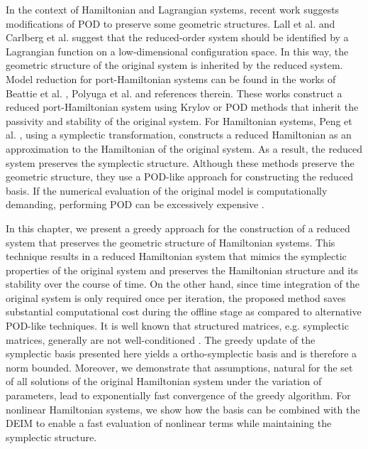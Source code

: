 In the context of Hamiltonian and Lagrangian systems, recent work suggests modifications of POD to preserve some geometric structures. Lall et al. \cite{lall2003structure} and Carlberg et al. \cite{doi:10.1137/140959602} suggest that the reduced-order system should be identified by a Lagrangian function on a low-dimensional configuration space. In this way, the geometric structure of the original system is inherited by the reduced system.  Model reduction for port-Hamiltonian systems can be found in the works of Beattie et al. \cite{doi:10.1137/15M1055085}, Polyuga et al. \cite{polyuga2010structure} and references therein. These works construct a reduced port-Hamiltonian system using Krylov or POD methods that inherit the passivity and stability of the original system. For Hamiltonian systems, Peng et al. \cite{doi:10.1137/140978922}, using a symplectic transformation, constructs a reduced Hamiltonian as an approximation to the Hamiltonian of the original system. As a result, the reduced system preserves the symplectic structure. Although these methods preserve the geometric structure, they use a POD-like approach for constructing the reduced basis. If the numerical evaluation of the original model is computationally demanding, performing POD can be excessively expensive \cite{quarteroni2015reduced}.

In this chapter, we present a greedy approach for the construction of a reduced system that preserves the geometric structure of Hamiltonian systems. This technique results in a reduced Hamiltonian system that mimics the symplectic properties of the original system and preserves the Hamiltonian structure and its stability over the course of time. On the other hand, since time integration of the original system is only required once per iteration, the proposed method saves substantial computational cost during the offline stage as compared to alternative POD-like techniques. It is well known that structured matrices, e.g. symplectic matrices, generally are not well-conditioned \cite{doi:10.1137/050628519}. The greedy update of the symplectic basis presented here yields a ortho-symplectic basis and is therefore a norm bounded. Moreover, we demonstrate that assumptions, natural for the set of all solutions of the original Hamiltonian system under the variation of parameters, lead to exponentially fast convergence of the greedy algorithm. For nonlinear Hamiltonian systems, we show how the basis can be combined with the DEIM \cite{doi:10.1137/090766498,barrault2004empirical} to enable a fast evaluation of nonlinear terms while maintaining the symplectic structure.

